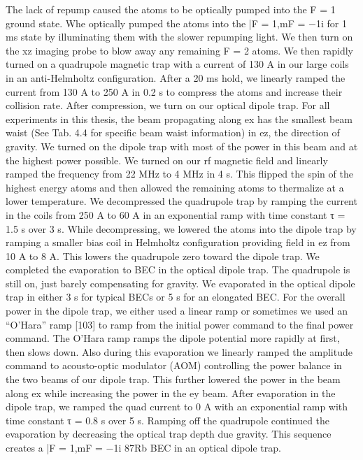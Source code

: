  The lack of repump caused the atoms to be optically
pumped into the F = 1 ground state. Whe optically pumped the atoms into the
|F = 1,mF = −1i for 1 ms state by illuminating them with the slower repumping
light. We then turn on the xz imaging probe to blow away any remaining F = 2
atoms.
We then rapidly turned on a quadrupole magnetic trap with a current of
130 A in our large coils in an anti-Helmholtz configuration. After a 20 ms hold,
we linearly ramped the current from 130 A to 250 A in 0.2 s to compress the
atoms and increase their collision rate. After compression, we turn on our optical
dipole trap. For all experiments in this thesis, the beam propagating along
ex has the smallest beam waist (See Tab. 4.4 for specific beam waist information)
in ez, the direction of gravity. We turned on the dipole trap with most of
the power in this beam and at the highest power possible. We turned on our
rf magnetic field and linearly ramped the frequency from 22 MHz to 4 MHz in
4 s. This flipped the spin of the highest energy atoms and then allowed the
remaining atoms to thermalize at a lower temperature. We decompressed the
quadrupole trap by ramping the current in the coils from 250 A to 60 A in an
exponential ramp with time constant τ = 1.5 s over 3 s. While decompressing,
we lowered the atoms into the dipole trap by ramping a smaller bias coil in
Helmholtz configuration providing field in ez from 10 A to 8 A. This lowers the
quadrupole zero toward the dipole trap.
We completed the evaporation to BEC in the optical dipole trap. The
quadrupole is still on, just barely compensating for gravity. We evaporated in
the optical dipole trap in either 3 s for typical BECs or 5 s for an elongated
BEC. For the overall power in the dipole trap, we either used a linear ramp
or sometimes we used an “O’Hara” ramp [103] to ramp from the initial power
command to the final power command. The O’Hara ramp ramps the dipole potential
more rapidly at first, then slows down. Also during this evaporation we
linearly ramped the amplitude command to acousto-optic modulator (AOM)
controlling the power balance in the two beams of our dipole trap. This further
lowered the power in the beam along ex while increasing the power in the ey
beam. After evaporation in the dipole trap, we ramped the quad current to 0 A
with an exponential ramp with time constant τ = 0.8 s over 5 s. Ramping off the
quadrupole continued the evaporation by decreasing the optical trap depth due
gravity. This sequence creates a |F = 1,mF = −1i 87Rb BEC in an optical dipole
trap.

